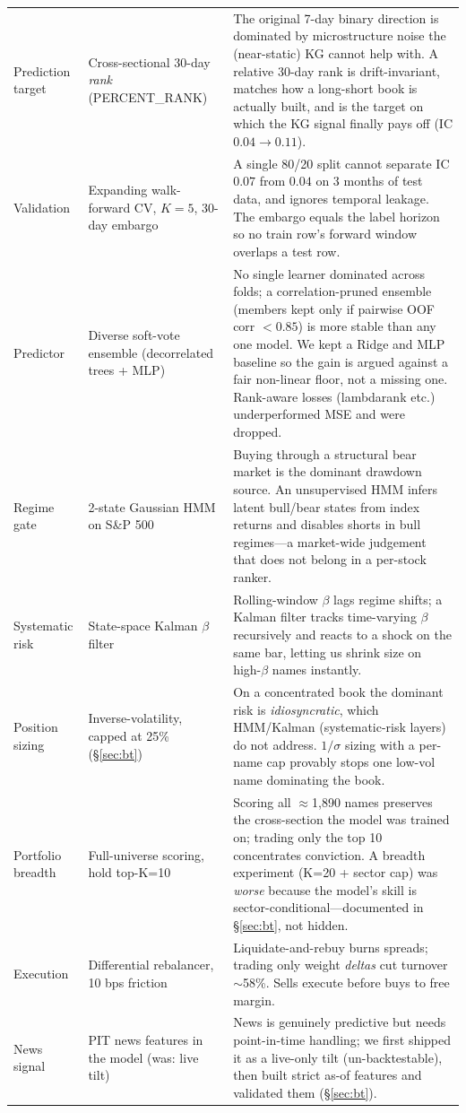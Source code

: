 \documentclass[10pt,journal,compsoc]{IEEEtran}
\begin{document}
\begin{table}[tbp]
\begin{tabular}{@{}p{2.5cm}p{3.4cm}p{10.3cm}@{}}
Prediction target & Cross-sectional 30-day \emph{rank} (PERCENT\_RANK) & The original 7-day binary direction is dominated by microstructure noise the (near-static) KG cannot help with. A relative 30-day rank is drift-invariant, matches how a long-short book is actually built, and is the target on which the KG signal finally pays off (IC $0.04\!\to\!0.11$). \\
Validation & Expanding walk-forward CV, $K{=}5$, 30-day embargo & A single 80/20 split cannot separate IC $0.07$ from $0.04$ on 3 months of test data, and ignores temporal leakage. The embargo equals the label horizon so no train row's forward window overlaps a test row. \\
Predictor & Diverse soft-vote ensemble (decorrelated trees + MLP) & No single learner dominated across folds; a correlation-pruned ensemble (members kept only if pairwise OOF corr $<0.85$) is more stable than any one model. We kept a Ridge and MLP baseline so the gain is argued against a fair non-linear floor, not a missing one. Rank-aware losses (lambdarank etc.) underperformed MSE and were dropped. \\
Regime gate & 2-state Gaussian HMM on S\&P 500 & Buying through a structural bear market is the dominant drawdown source. An unsupervised HMM infers latent bull/bear states from index returns and disables shorts in bull regimes---a market-wide judgement that does not belong in a per-stock ranker. \\
Systematic risk & State-space Kalman $\beta$ filter & Rolling-window $\beta$ lags regime shifts; a Kalman filter tracks time-varying $\beta$ recursively and reacts to a shock on the same bar, letting us shrink size on high-$\beta$ names instantly. \\
Position sizing & Inverse-volatility, capped at 25\% (\S\ref{sec:bt}) & On a concentrated book the dominant risk is \emph{idiosyncratic}, which HMM/Kalman (systematic-risk layers) do not address. $1/\sigma$ sizing with a per-name cap provably stops one low-vol name dominating the book. \\
Portfolio breadth & Full-universe scoring, hold top-K=10 & Scoring all $\approx$1{,}890 names preserves the cross-section the model was trained on; trading only the top 10 concentrates conviction. A breadth experiment (K=20 + sector cap) was \emph{worse} because the model's skill is sector-conditional---documented in \S\ref{sec:bt}, not hidden. \\
Execution & Differential rebalancer, 10 bps friction & Liquidate-and-rebuy burns spreads; trading only weight \emph{deltas} cut turnover $\sim$58\%. Sells execute before buys to free margin. \\
News signal & PIT news features in the model (was: live tilt) & News is genuinely predictive but needs point-in-time handling; we first shipped it as a live-only tilt (un-backtestable), then built strict as-of features and validated them (\S\ref{sec:bt}). \\
\bottomrule
\end{tabular}
\end{table}
\end{document}
